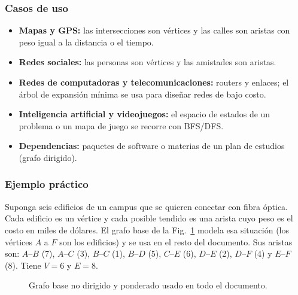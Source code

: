 \documentclass[conference]{IEEEtran}
\begin{document}
\subsubsection{Casos de uso}
\begin{itemize}
  \item \textbf{Mapas y GPS:} las intersecciones son vértices y las calles son aristas con peso igual a la distancia o el tiempo.
  \item \textbf{Redes sociales:} las personas son vértices y las amistades son aristas.
  \item \textbf{Redes de computadoras y telecomunicaciones:} routers y enlaces; el árbol de expansión mínima se usa para diseñar redes de bajo costo.
  \item \textbf{Inteligencia artificial y videojuegos:} el espacio de estados de un problema o un mapa de juego se recorre con BFS/DFS.
  \item \textbf{Dependencias:} paquetes de software o materias de un plan de estudios (grafo dirigido).
\end{itemize}

\subsubsection{Ejemplo práctico}
Suponga seis edificios de un campus que se quieren conectar con fibra óptica. Cada edificio es un vértice y cada posible tendido es una arista cuyo peso es el costo en miles de dólares. El grafo base de la Fig.~\ref{fig:base} modela esa situación (los vértices $A$ a $F$ son los edificios) y se usa en el resto del documento. Sus aristas son: $A$--$B$ (7), $A$--$C$ (3), $B$--$C$ (1), $B$--$D$ (5), $C$--$E$ (6), $D$--$E$ (2), $D$--$F$ (4) y $E$--$F$ (8). Tiene $V=6$ y $E=8$.

\begin{figure}[t]
\centering
{}
\caption{Grafo base no dirigido y ponderado usado en todo el documento.}
\label{fig:base}
\end{figure}
\end{document}
